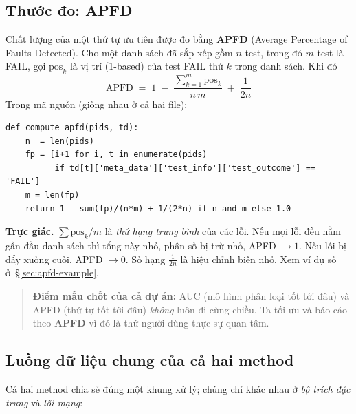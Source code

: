 \documentclass[11pt]{article}
\theoremstyle{definition}
\begin{document}
\subsection{Thước đo: APFD}
\label{sec:apfd}
Chất lượng của một thứ tự ưu tiên được đo bằng \textbf{APFD} (Average Percentage
of Faults Detected). Cho một danh sách đã sắp xếp gồm $n$ test, trong đó $m$ test
là FAIL, gọi $\mathrm{pos}_k$ là vị trí (1-based) của test FAIL thứ $k$ trong
danh sách. Khi đó
\begin{equation}
\boxed{\;\mathrm{APFD} \;=\; 1 \;-\; \frac{\sum_{k=1}^{m}\mathrm{pos}_k}{n\,m}
\;+\; \frac{1}{2n}\;}
\label{eq:apfd}
\end{equation}
Trong mã nguồn (giống nhau ở cả hai file):
\begin{lstlisting}
def compute_apfd(pids, td):
    n  = len(pids)
    fp = [i+1 for i, t in enumerate(pids)
          if td[t]['meta_data']['test_info']['test_outcome'] == 'FAIL']
    m = len(fp)
    return 1 - sum(fp)/(n*m) + 1/(2*n) if n and m else 1.0
\end{lstlisting}

\noindent\textbf{Trực giác.} $\sum \mathrm{pos}_k / m$ là \emph{thứ hạng trung
bình} của các lỗi. Nếu mọi lỗi đều nằm gần đầu danh sách thì tổng này nhỏ, phân
số bị trừ nhỏ, APFD $\to 1$. Nếu lỗi bị đẩy xuống cuối, APFD $\to 0$. Số hạng
$\tfrac{1}{2n}$ là hiệu chỉnh biên nhỏ. Xem ví dụ số ở~\S\ref{sec:apfd-example}.

\begin{quote}\small\color{cInk}
\textbf{Điểm mấu chốt của cả dự án:} AUC (mô hình phân loại tốt tới đâu) và APFD
(thứ tự tốt tới đâu) \emph{không} luôn đi cùng chiều. Ta tối ưu và báo cáo theo
\textbf{APFD} vì đó là thứ người dùng thực sự quan tâm.
\end{quote}

\subsection{Luồng dữ liệu chung của cả hai method}
Cả hai method chia sẻ đúng một khung xử lý; chúng chỉ khác nhau ở
\emph{bộ trích đặc trưng} và \emph{lõi mạng}:
\end{document}
